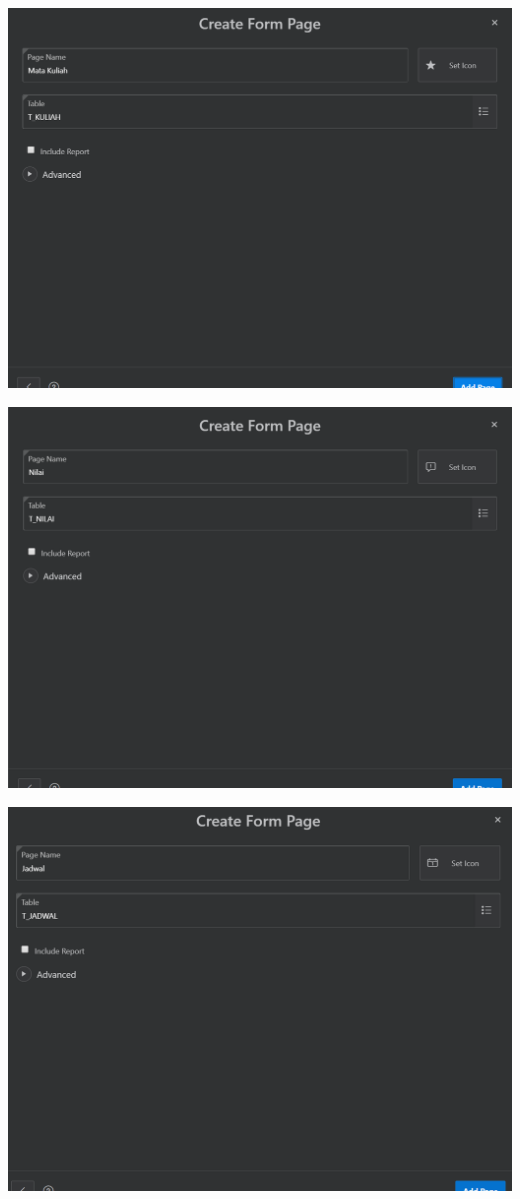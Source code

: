 \documentclass{article}
\begin{document}
\begin{enumerate}
\begin{center}
\end{center}
\begin{center}
    \includegraphics[width=.8\textwidth]{figure/30.PNG}
\end{center}
\begin{center}
    \includegraphics[width=.8\textwidth]{figure/31.PNG}
\end{center}
\begin{center}
    \includegraphics[width=.8\textwidth]{figure/32.PNG}

\end{center}
\end{enumerate}
\end{document}
